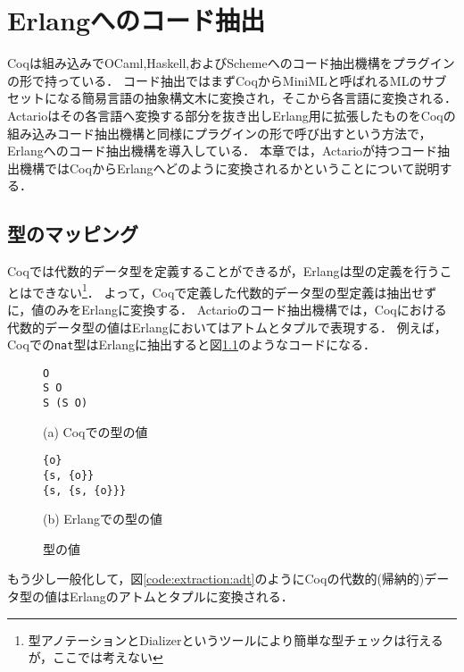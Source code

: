 \chapter{Erlangへのコード抽出}
\label{chapter:extraction}

Coqは組み込みでOCaml,Haskell,およびSchemeへのコード抽出機構をプラグインの形で持っている．
コード抽出ではまずCoqからMiniMLと呼ばれるMLのサブセットになる簡易言語の抽象構文木に変換され，そこから各言語に変換される．
Actarioはその各言語へ変換する部分を抜き出しErlang用に拡張したものをCoqの組み込みコード抽出機構と同様にプラグインの形で呼び出すという方法で，Erlangへのコード抽出機構を導入している．
本章では，Actarioが持つコード抽出機構ではCoqからErlangへどのように変換されるかということについて説明する．

\section{型のマッピング}

Coqでは代数的データ型を定義することができるが，Erlangは型の定義を行うことはできない\footnote{型アノテーションとDializerというツールにより簡単な型チェックは行えるが，ここでは考えない}．
よって，Coqで定義した代数的データ型の型定義は抽出せずに，値のみをErlangに変換する．
Actarioのコード抽出機構では，Coqにおける代数的データ型の値はErlangにおいてはアトムとタプルで表現する．
例えば，Coqでの\texttt{nat}型はErlangに抽出すると図\ref{code:extraction:datamapping-nat}のようなコードになる．

\begin{figure}\centering
\begin{minipage}{0.4\textwidth}\centering
\begin{lstlisting}[frame=single,numbers=none,xleftmargin=0pt]
O
S O
S (S O)
\end{lstlisting}
(a) Coqでの型の値
\end{minipage}
\hspace*{3ex}
\begin{minipage}{0.4\textwidth}\centering
\begin{lstlisting}[frame=single,numbers=none,xleftmargin=0pt]
{o}
{s, {o}}
{s, {s, {o}}}
\end{lstlisting}
(b) Erlangでの型の値
\end{minipage}
\label{code:extraction:datamapping-nat}
\caption{型の値}
\end{figure}

もう少し一般化して，図\ref{code:extraction:adt}のようにCoqの代数的(帰納的)データ型の値はErlangのアトムとタプルに変換される．

